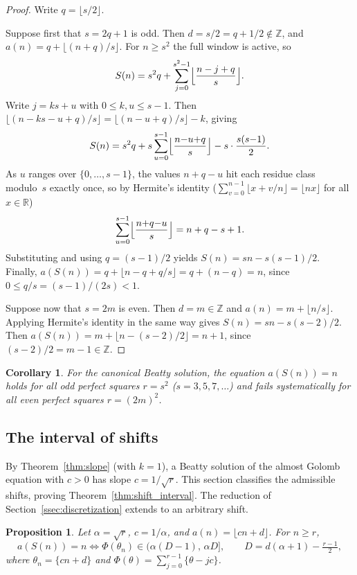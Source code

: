 \documentclass{birkjour}
\newtheorem{proposition}[theorem]{Proposition}
\newtheorem{corollary}[theorem]{Corollary}
\theoremstyle{definition}
\theoremstyle{remark}
\newcommand{\fl}[1]{\lfloor #1 \rfloor}
\newcommand{\frc}[1]{\{ #1 \}}
\begin{document}
\begin{proof}
Write $q=\fl{s/2}$.

Suppose first that $s=2q{+}1$ is odd.
Then $d=s/2=q+1/2\notin\mathbb{Z}$, and
$a(n)=q+\fl{(n{+}q)/s}$.
For $n\ge s^{2}$ the full window is active, so
\[
  S(n)
  =s^{2}q+\sum_{j=0}^{s^{2}-1}
  \Bigl\lfloor\frac{n-j+q}{s}\Bigr\rfloor.
\]
Write $j=ks+u$ with $0\le k,u\le s{-}1$.
Then $\fl{(n{-}ks{-}u{+}q)/s}
=\fl{(n{-}u{+}q)/s}-k$, giving
\[
  S(n)
  =s^{2}q
  +s\sum_{u=0}^{s-1}\Bigl\lfloor\frac{n{-}u{+}q}{s}
  \Bigr\rfloor
  -s\cdot\frac{s(s{-}1)}{2}.
\]
As $u$ ranges over $\{0,\ldots,s{-}1\}$,
the values $n{+}q{-}u$ hit each residue class
modulo~$s$ exactly once, so by Hermite's identity
($\sum_{v=0}^{n-1}\fl{x+v/n}=\fl{nx}$ for all
$x\in\mathbb{R}$)
\[
  \sum_{u=0}^{s-1}\Bigl\lfloor\frac{n{+}q{-}u}{s}
  \Bigr\rfloor=n+q-s+1.
\]
Substituting and using $q=(s{-}1)/2$ yields
$S(n)=sn-s(s{-}1)/2$.
Finally,
$a(S(n))
=q+\fl{n{-}q+q/s}=q+(n{-}q)=n$,
since $0\le q/s=(s{-}1)/(2s)<1$.

Suppose now that $s=2m$ is even.
Then $d=m\in\mathbb{Z}$ and
$a(n)=m+\fl{n/s}$.
Applying Hermite's identity in the same way gives
$S(n)=sn-s(s{-}2)/2$.
Then $a(S(n))
=m+\fl{n{-}(s{-}2)/2}=n+1$,
since $(s{-}2)/2=m{-}1\in\mathbb{Z}$.
\end{proof}

\begin{corollary}
For the canonical Beatty solution, the equation $a(S(n))=n$
holds for all odd perfect squares $r=s^{2}$
($s=3,5,7,\ldots$) and fails systematically
for all even perfect squares $r=(2m)^{2}$.
\end{corollary}

\subsection{The interval of shifts}

By Theorem~\ref{thm:slope} (with $k=1$), a Beatty solution of
the almost Golomb equation with $c>0$ has slope
$c=1/\!\sqrt{r}$. This section classifies the admissible
shifts, proving Theorem~\ref{thm:shift_interval}. The reduction
of Section~\ref{ssec:discretization} extends to an arbitrary
shift.

\begin{proposition}\label{prop:general_shift}
Let $\alpha=\sqrt{r}$, $c=1/\alpha$, and $a(n)=\fl{cn+d}$.
For $n\ge r$,
\[
  a(S(n))=n
  \iff
  \Phi(\theta_{n})\in\bigl(\alpha(D-1),\,\alpha D\bigr],
  \qquad D=d(\alpha+1)-\tfrac{r-1}{2},
\]
where $\theta_{n}=\frc{cn+d}$ and
$\Phi(\theta)=\sum_{j=0}^{r-1}\frc{\theta-jc}$.
\end{proposition}
\end{document}

